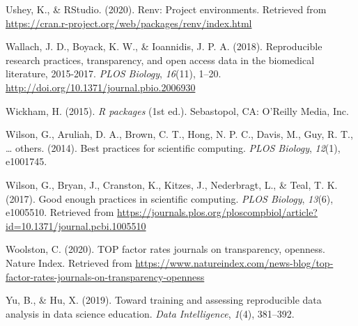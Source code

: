 \documentclass[12pt,twoside]{reedthesis}
\begin{document}
\hypertarget{ref-R-renv}{}
Ushey, K., \& RStudio. (2020). Renv: Project environments. Retrieved
from \url{https://cran.r-project.org/web/packages/renv/index.html}

\hypertarget{ref-plos-biology}{}
Wallach, J. D., Boyack, K. W., \& Ioannidis, J. P. A. (2018).
Reproducible research practices, transparency, and open access data in
the biomedical literature, 2015-2017. \emph{PLOS Biology},
\emph{16}(11), 1--20. \url{http://doi.org/10.1371/journal.pbio.2006930}

\hypertarget{ref-hadley-packages}{}
Wickham, H. (2015). \emph{R packages} (1st ed.). Sebastopol, CA:
O'Reilly Media, Inc.

\hypertarget{ref-wilson2014best}{}
Wilson, G., Aruliah, D. A., Brown, C. T., Hong, N. P. C., Davis, M.,
Guy, R. T., \ldots{} others. (2014). Best practices for scientific
computing. \emph{PLOS Biology}, \emph{12}(1), e1001745.

\hypertarget{ref-wilson2017good}{}
Wilson, G., Bryan, J., Cranston, K., Kitzes, J., Nederbragt, L., \&
Teal, T. K. (2017). Good enough practices in scientific computing.
\emph{PLOS Biology}, \emph{13}(6), e1005510. Retrieved from
\url{https://journals.plos.org/ploscompbiol/article?id=10.1371/journal.pcbi.1005510}

\hypertarget{ref-top-guidelines}{}
Woolston, C. (2020). TOP factor rates journals on transparency,
openness. Nature Index. Retrieved from
\url{https://www.natureindex.com/news-blog/top-factor-rates-journals-on-transparency-openness}

\hypertarget{ref-yu2019toward}{}
Yu, B., \& Hu, X. (2019). Toward training and assessing reproducible
data analysis in data science education. \emph{Data Intelligence},
\emph{1}(4), 381--392.


\end{document}

